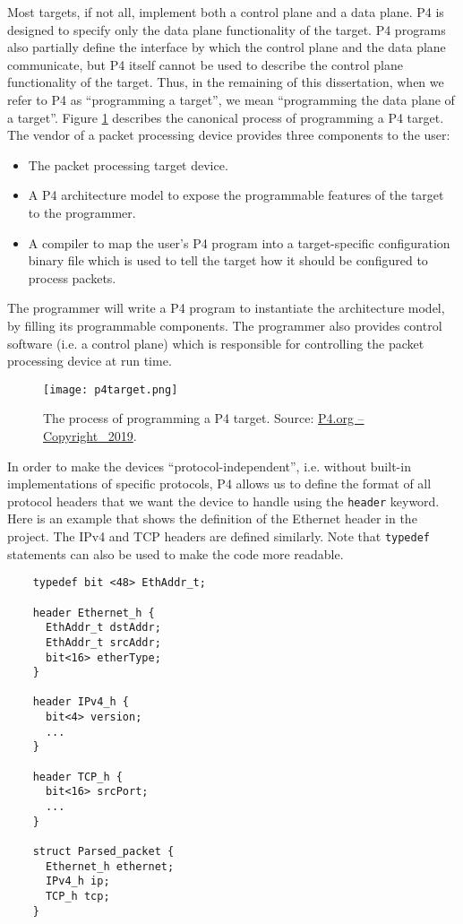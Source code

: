 Most targets, if not all, implement both a control plane and a data plane. P4 is designed to specify only the data plane functionality of the target. P4 programs also partially define the interface by which the control plane and the data plane communicate, but P4 itself cannot be used to describe the control plane functionality of the target. Thus, in the remaining of this dissertation, when we refer to P4 as “programming a target”, we mean “programming the data plane of a target”. Figure \ref{p4target} describes the canonical process of programming a P4 target. The vendor of a packet processing device provides three components to the user:

\begin{itemize}
	\item The packet processing target device.
	\item A P4 architecture model to expose the programmable features of the target to the programmer.
	\item A compiler to map the user’s P4 program into a target-specific configuration binary file which is used to tell the target how it should be configured to process packets.
\end{itemize}

The programmer will write a P4 program to instantiate the architecture model, by filling its programmable components. The programmer also provides control software (i.e. a control plane) which is responsible for controlling the packet processing device at run time.

\begin{figure}[ht]
	\centering
	\texttt{[image: p4target.png]}
	\caption{The process of programming a P4 target. Source: \href{https://p4.org}{P4.org -- Copyright \textcopyright\ 2019}.} 
	\label{p4target}
\end{figure}

In order to make the devices ``protocol-independent'', i.e. without built-in implementations of specific protocols, P4 allows us to define the format of all protocol headers that we want the device to handle using the \texttt{header} keyword. Here is an example that shows the definition of the Ethernet header in the project. The IPv4 and TCP headers are defined similarly. Note that \texttt{typedef} statements can also be used to make the code more readable.

{\renewcommand{\baselinestretch}{0.8}\small
	\begin{verbatim}
    typedef bit <48> EthAddr_t;
	
    header Ethernet_h {
      EthAddr_t dstAddr;
      EthAddr_t srcAddr;
      bit<16> etherType;
    }
	
    header IPv4_h {
      bit<4> version;
      ...
    }
	
    header TCP_h {
      bit<16> srcPort;
      ...
    }
	
    struct Parsed_packet {
      Ethernet_h ethernet;
      IPv4_h ip;
      TCP_h tcp;
    }
	\end{verbatim}
}


